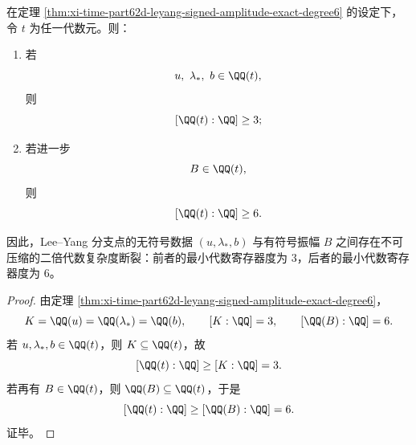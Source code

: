 \begin{corollary}\label{cor:xi-time-part62d-leyang-unsigned-signed-register-gap}
在定理 \ref{thm:xi-time-part62d-leyang-signed-amplitude-exact-degree6} 的设定下，令 \(t\) 为任一代数元。则：
\begin{enumerate}
  \item 若
  \[
  u,\ \lambda_*,\ b\in \QQ(t),
  \]
  则
  \[
  [\QQ(t):\QQ]\ge 3;
  \]
  \item 若进一步
  \[
  B\in \QQ(t),
  \]
  则
  \[
  [\QQ(t):\QQ]\ge 6.
  \]
\end{enumerate}
因此，Lee--Yang 分支点的无符号数据 \((u,\lambda_*,b)\) 与有符号振幅 \(B\) 之间存在不可压缩的二倍代数复杂度断裂：前者的最小代数寄存器度为 \(3\)，后者的最小代数寄存器度为 \(6\)。
\end{corollary}
\begin{proof}
由定理 \ref{thm:xi-time-part62d-leyang-signed-amplitude-exact-degree6}，
\[
K=\QQ(u)=\QQ(\lambda_*)=\QQ(b),
\qquad
[K:\QQ]=3,
\qquad
[\QQ(B):\QQ]=6.
\]
若 \(u,\lambda_*,b\in \QQ(t)\)，则 \(K\subseteq \QQ(t)\)，故
\[
[\QQ(t):\QQ]\ge [K:\QQ]=3.
\]
若再有 \(B\in \QQ(t)\)，则 \(\QQ(B)\subseteq \QQ(t)\)，于是
\[
[\QQ(t):\QQ]\ge [\QQ(B):\QQ]=6.
\]
证毕。
\end{proof}

